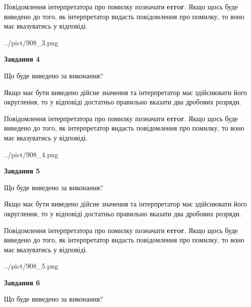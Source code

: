 \documentclass[12pt, ukrainian]{article}
\begin{document}
{\begin {Large}
Повідомлення інтерпретатора про помилку позначати \textbf{error}.
Якщо щось буде виведено до того, як інтерпретатор видасть повідомлення про помилку, 
то воно має вказуватись у відповіді. \par

\begin{center}
	{../pict/908_3.png}
\end{center}
\newpage

{\begin {center}\textbf{Завдання 4}\end {center}}\par
Що буде виведено за виконання? \par

Якщо має бути виведено дійсне значення та інтерпретатор має здійснювати його округлення, 
то у відповіді достатньо правильно вказати два дробових розряди.

Повідомлення інтерпретатора про помилку позначати \textbf{error}.
Якщо щось буде виведено до того, як інтерпретатор видасть повідомлення про помилку, 
то воно має вказуватись у відповіді. \par

\begin{center}
	{../pict/908_4.png}
\end{center}
\newpage

{\begin {center}\textbf{Завдання 5}\end {center}}\par
Що буде виведено за виконання? \par

Якщо має бути виведено дійсне значення та інтерпретатор має здійснювати його округлення, 
то у відповіді достатньо правильно вказати два дробових розряди.

Повідомлення інтерпретатора про помилку позначати \textbf{error}.
Якщо щось буде виведено до того, як інтерпретатор видасть повідомлення про помилку, 
то воно має вказуватись у відповіді. \par

\begin{center}
	{../pict/908_5.png}
\end{center}
\newpage

{\begin {center}\textbf{Завдання 6}\end {center}}\par
Що буде виведено за виконання? \par


\end{Large}}
\end{document}
